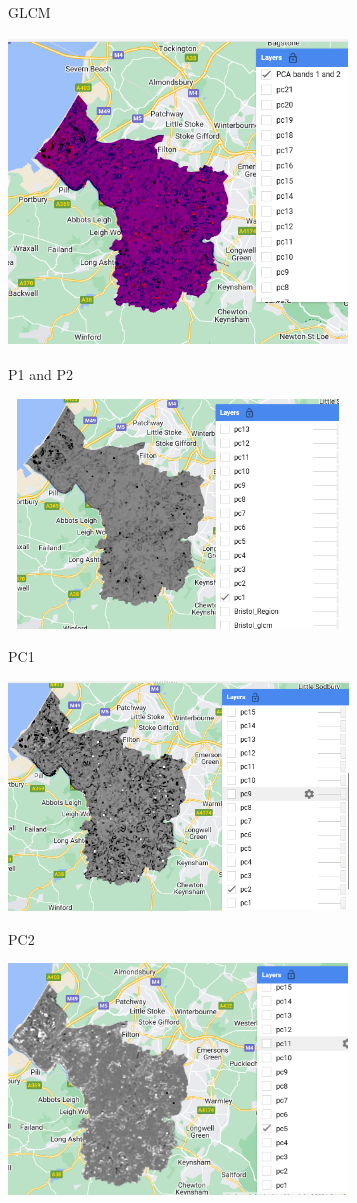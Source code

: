 \documentclass[
  letterpaper,
  DIV=11,
  numbers=noendperiod]{scrreprt}
\begin{document}
GLCM

\includegraphics[width=3.54167in,height=3.22917in]{images/wk6/PC1_and_PC2.png}

P1 and P2

\includegraphics[width=3.54167in,height=2.39583in]{images/wk6/PC1.png}

PC1

\includegraphics[width=3.55208in,height=\textheight]{images/wk6/PC2.png}

PC2

\includegraphics[width=3.54167in,height=\textheight]{images/wk6/PC5.png}
\end{document}
